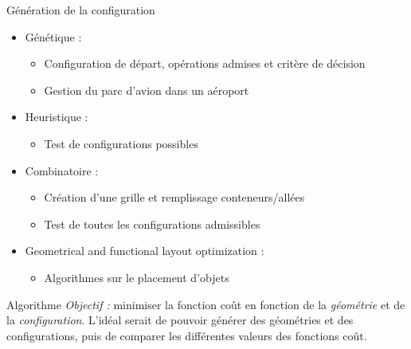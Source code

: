 \begin{frame}{Génération de la configuration}
  \begin{itemize}
  \item Génétique \cite{gotteland2004}:
    \begin{itemize}
    \item Configuration de départ, opérations admises et critère de décision
    \item Gestion du parc d'avion dans un aéroport 
    \end{itemize}
    \vfill
  \item Heuristique \cite{ndiaye2015}:
    \begin{itemize}
    \item Test de configurations possibles
    \end{itemize}
    \vfill
  \item Combinatoire \cite{moussi2012}:
    \begin{itemize}
    \item Création d'une grille et remplissage conteneurs/allées
    \item Test de toutes les configurations admissibles
    \end{itemize}
    \vfill
  \item Geometrical and functional layout optimization \cite{jacquenot2010}:
    \begin{itemize}
    \item Algorithmes sur le placement d'objets
    \end{itemize}
  \end{itemize}
\end{frame}

\begin{frame}{Algorithme}
  \vfill
  \emph{Objectif : } minimiser la fonction coût en fonction de la \emph{géométrie} et de la \emph{configuration}.
  \vfill
  L'idéal serait de pouvoir générer des géométries et des configurations, puis de comparer les différentes valeurs des fonctions coût. 
  \vfill  
\end{frame}

